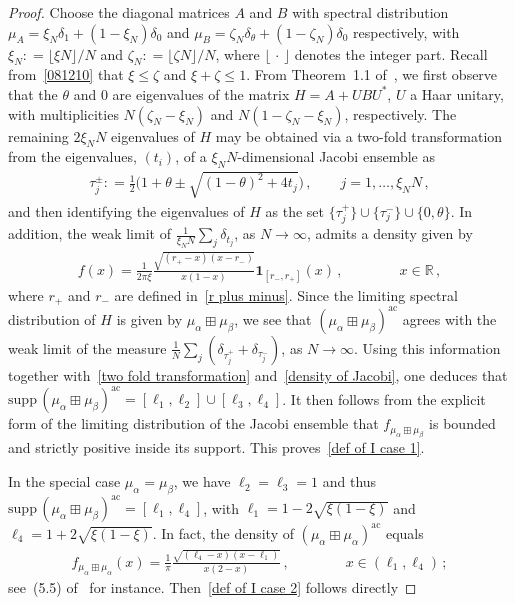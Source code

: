 \documentclass[10pt,reqno]{amsart}
\numberwithin{equation}{section}
\theoremstyle{plain}
\numberwithin{kevin}{section}
\theoremstyle{remark}
\newcommand{\R}{{\mathbb R }}
\newcommand{\deq}{\mathrel{\mathop:}=}
\begin{document}
\begin{proof} Choose the diagonal matrices $A$ and $B$ with spectral distribution $\mu_A=\xi_N\delta_1+(1-\xi_N)\delta_0$ and $\mu_B=\zeta_N\delta_\theta+(1-\zeta_N)\delta_0$ respectively, with $\xi_N\deq\lfloor \xi N\rfloor/N$ and $\zeta_N\deq\lfloor \zeta N\rfloor/N$, where $\lfloor\,\cdot\,\rfloor$ denotes the integer part. Recall from~\eqref{081210} that $\xi\leq \zeta$ and  $\xi+\zeta\leq 1$.
From Theorem~1.1 of~\cite{Kargin2012a}, we first observe that the $\theta$ and $0$ are eigenvalues of the matrix $H=A+UBU^*$, $U$ a Haar unitary, with multiplicities $N(\zeta_N-\xi_N)$ and $N(1-\zeta_N-\xi_N)$, respectively. The remaining $2\xi_N N$ eigenvalues of $H$ may be obtained via a two-fold transformation from the eigenvalues, $(t_i)$, of a $\xi_N N$-dimensional Jacobi ensemble as
\begin{align}
\tau_{ j}^{\pm}\deq\frac{1}{2}\Big(1+\theta\pm \sqrt{(1-\theta)^2+4 t_j}\Big)\,,\qquad j=1,\ldots, \xi_N N\,, \label{two fold transformation}
\end{align}
and then identifying the eigenvalues of $H$ as the set $\{\tau_j^{+}\}\cup \{\tau_j^{-}\}\cup\{0,\theta\}$.
In addition, the weak limit of $\frac{1}{\xi_N N}\sum_j \delta_{t_j}$, as $N\to\infty$, admits a density given by 
\begin{align}
f(x)=\frac{1}{2\pi\xi}\frac{\sqrt{(r_+-x)(x-r_-)}}{x(1-x)} \mathbf{1}_{[r_-,r_+]}(x)\,,\qquad\qquad x\in\R\,, \label{density of Jacobi}
\end{align}
where $r_+$ and $r_-$ are defined in~\eqref{r plus minus}. Since the limiting spectral distribution of $H$ is given by $\mu_\alpha\boxplus\mu_\beta$, we see that  $(\mu_\alpha\boxplus\mu_\beta)^{\mathrm{ac}}$ agrees with the weak limit of the measure $\frac{1}{N}\sum_{j}(\delta_{\tau_j^+}+\delta_{\tau_{j}^-})$, as $N\to\infty$. 
Using this information together with~\eqref{two fold transformation} and~\eqref{density of Jacobi}, one deduces that $\mathrm{supp}\, (\mu_\alpha\boxplus\mu_\beta)^{\mathrm{ac}}=[\ell_1,\ell_2]\cup [\ell_3,\ell_4]$.  It then follows from the explicit form of the limiting distribution of the Jacobi ensemble that $f_{\mu_\alpha\boxplus\mu_\beta}$ is bounded and strictly positive inside its support. This proves~\eqref{def of I case 1}.

 

In the special case $\mu_\alpha=\mu_\beta$, we have $\ell_2=\ell_3=1$ and thus $\mathrm{supp}\,(\mu_\alpha\boxplus\mu_\beta)^{\mathrm{ac}}=[\ell_1,\ell_4]$, with $\ell_1=1-2\sqrt{\xi(1-\xi)}$ and $\ell_4=1+2\sqrt{\xi(1-\xi)}$. In fact, the density of $(\mu_\alpha\boxplus\mu_\alpha)^{\mathrm{ac}}$ equals
\begin{align}\label{le fa density}
f_{\mu_\alpha\boxplus\mu_\alpha}(x)=\frac{1}{\pi}\frac{\sqrt{(\ell_4-x)(x-\ell_1)}}{x(2-x)}\,,\qquad\qquad x\in (\ell_1,\ell_4)\,;
\end{align}
see~(5.5) of~\cite{VP} for instance. Then~\eqref{def of I case 2} follows directly
\end{proof}
\end{document}
